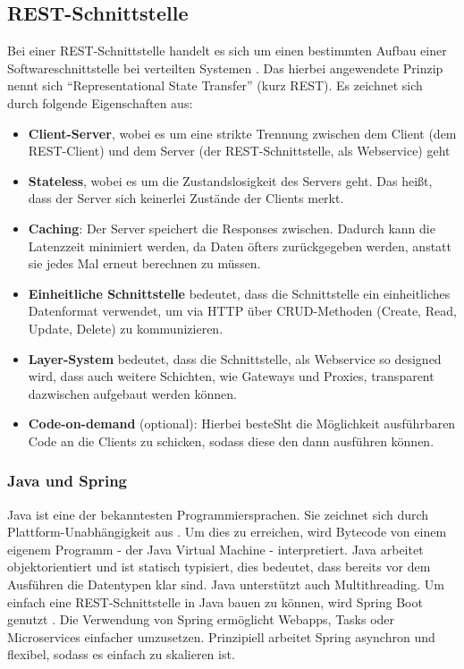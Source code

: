 	\subsection{REST-Schnittstelle}
	Bei einer REST-Schnittstelle handelt es sich um einen bestimmten Aufbau einer Softwareschnittstelle bei verteilten Systemen \cite{Patni2017}. Das hierbei angewendete Prinzip nennt sich \enquote{Representational State Transfer} (kurz REST). Es zeichnet sich durch folgende Eigenschaften aus:
	\begin{itemize}
		\item \textbf{Client-Server}, wobei es um eine strikte Trennung zwischen dem Client (dem REST-Client) und dem Server (der REST-Schnittstelle, als Webservice) geht
		\item \textbf{Stateless}, wobei es um die Zustandslosigkeit des Servers geht. Das heißt, dass der Server sich keinerlei Zustände der Clients merkt.
		\item \textbf{Caching}: Der Server speichert die Responses zwischen. Dadurch kann die Latenzzeit minimiert werden, da Daten öfters zurückgegeben werden, anstatt sie jedes Mal erneut berechnen zu müssen.
		\item \textbf{Einheitliche Schnittstelle} bedeutet, dass die Schnittstelle ein einheitliches Datenformat verwendet, um via HTTP über CRUD-Methoden (Create, Read, Update, Delete) zu kommunizieren.
		\item \textbf{Layer-System} bedeutet, dass die Schnittstelle, als Webservice so designed wird, dass auch weitere Schichten, wie Gateways und Proxies, transparent dazwischen aufgebaut werden können.
		\item \textbf{Code-on-demand} (optional): Hierbei besteSht die Möglichkeit ausführbaren Code an die Clients zu schicken, sodass diese den dann ausführen können.
	\end{itemize}
		\subsubsection{Java und Spring}
		Java ist eine der bekanntesten Programmiersprachen. Sie zeichnet sich durch Plattform-Unabhängigkeit aus \cite{jdkDocs}. Um dies zu erreichen, wird Bytecode von einem eigenem Programm - der Java Virtual Machine - interpretiert. Java arbeitet objektorientiert und ist statisch typisiert, dies bedeutet, dass bereits vor dem Ausführen die Datentypen klar sind. Java unterstützt auch Multithreading. Um einfach eine REST-Schnittstelle in Java bauen zu können, wird Spring Boot genutzt \cite{springDocs}. Die Verwendung von Spring ermöglicht Webapps, Tasks oder Microservices einfacher umzusetzen. Prinzipiell arbeitet Spring asynchron und flexibel, sodass es einfach zu skalieren ist. 
		
